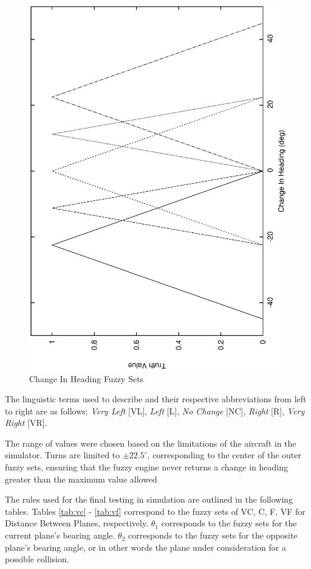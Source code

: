 \documentclass[10pt, conference, compsocconf]{IEEEtran}
\begin{document}
\begin{figure}[h]
\centering
\includegraphics[scale=0.35, angle=-90]{EPS/heading}
\caption{Change In Heading Fuzzy Sets}
\label{fig:heading}
\end{figure}
The linguistic terms used to describe and their respective abbreviations from left to right are as follows: {\it Very Left} [VL], {\it Left} [L], {\it No Change} [NC], {\it Right} [R], {\it Very Right} [VR].

The range of values were chosen based on the limitations of the aircraft in the simulator. Turns are limited to $\pm 22.5^\circ$, corresponding to the center of the outer fuzzy sets, ensuring that the fuzzy engine never returns a change in heading greater than the maximum value allowed

The rules used for the final testing in simulation are outlined in the following tables. Tables \ref{tab:vc} - \ref{tab:vf} correspond to the fuzzy sets of VC, C, F, VF for Distance Between Planes, respectively. $\theta_1$ corresponds to the fuzzy sets for the current plane's bearing angle. $\theta_2$ corresponds to the fuzzy sets for the opposite plane's bearing angle, or in other words the plane under consideration for a possible collision.
\end{document}
